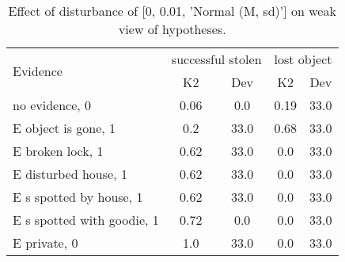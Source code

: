 \begin{table}\begin{tabular}{l|cc|cc}\toprule\multirow{2}{*}{Evidence} & \multicolumn{2}{c}{successful stolen}& \multicolumn{2}{c}{lost object}\\& {K2} & {Dev}& {K2} & {Dev}\\\midrule
no evidence, 0 & \cellcolor{Bittersweet}0.06&\cellcolor{Bittersweet}0.0&\cellcolor{Bittersweet}0.19&\cellcolor{Bittersweet}33.0\\E object is gone, 1 & \cellcolor{Bittersweet}0.2&\cellcolor{Bittersweet}33.0&\cellcolor{Bittersweet}0.68&\cellcolor{Bittersweet}33.0\\E broken lock, 1 & \cellcolor{Bittersweet}0.62&\cellcolor{Bittersweet}33.0&\cellcolor{Bittersweet}0.0&\cellcolor{Bittersweet}33.0\\E disturbed house, 1 & \cellcolor{Bittersweet}0.62&\cellcolor{Bittersweet}33.0&\cellcolor{Bittersweet}0.0&\cellcolor{Bittersweet}33.0\\E s spotted by house, 1 & \cellcolor{Bittersweet}0.62&\cellcolor{Bittersweet}33.0&\cellcolor{Bittersweet}0.0&\cellcolor{Bittersweet}33.0\\E s spotted with goodie, 1 & \cellcolor{Bittersweet}0.72&\cellcolor{Bittersweet}0.0&\cellcolor{Bittersweet}0.0&\cellcolor{Bittersweet}33.0\\E private, 0 & \cellcolor{Bittersweet}1.0&\cellcolor{Bittersweet}33.0&\cellcolor{Bittersweet}0.0&\cellcolor{Bittersweet}33.0\\\bottomrule\end{tabular}\caption{Effect of disturbance of [0, 0.01, 'Normal (M, sd)'] on weak view of hypotheses.}\end{table}
